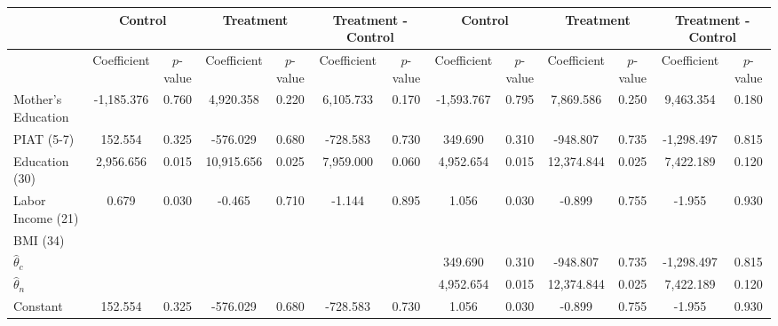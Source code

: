\begin{tabular}{lcccccccccccc} \toprule
&\multicolumn{2}{c}{Control} & \multicolumn{2}{c}{Treatment} & \multicolumn{2}{c}{Treatment - Control} & \multicolumn{2}{c}{Control} & \multicolumn{2}{c}{Treatment} & \multicolumn{2}{c}{Treatment - Control} \\ \midrule
 & Coefficient  & $p$-value  & Coefficient  & $p$-value & Coefficient  & $p$-value  & Coefficient  & $p$-value  & Coefficient  & $p$-value  & Coefficient  & $p$-value \\ \midrule
Mother's Education & -1,185.376 &     0.760 &  4,920.358 &     0.220 &  6,105.733 &     0.170 & -1,593.767 &     0.795 &  7,869.586 &     0.250 &  9,463.354 &     0.180 \\  
PIAT (5-7) &   152.554 &     0.325 &  -576.029 &     0.680 &  -728.583 &     0.730 &   349.690 &     0.310 &  -948.807 &     0.735 & -1,298.497 &     0.815 \\  
Education (30)  &  2,956.656 &     0.015 & 10,915.656 &     0.025 &  7,959.000 &     0.060 &  4,952.654 &     0.015 & 12,374.844 &     0.025 &  7,422.189 &     0.120 \\  
Labor Income (21) &     0.679 &     0.030 &    -0.465 &     0.710 &    -1.144 &     0.895 &     1.056 &     0.030 &    -0.899 &     0.755 &    -1.955 &     0.930 \\  
BMI (34) &        &        &        &        &        &        &        &        &        &        &        &         \\
$\hat{\theta}_{c}$ &        &        &        &        &        &        &   349.690 &     0.310 &  -948.807 &     0.735 & -1,298.497 &     0.815 \\  
$\hat{\theta}_{n}$ &        &        &        &        &        &        &  4,952.654 &     0.015 & 12,374.844 &     0.025 &  7,422.189 &     0.120 \\  
Constant &   152.554 &     0.325 &  -576.029 &     0.680 &  -728.583 &     0.730 &     1.056 &     0.030 &    -0.899 &     0.755 &    -1.955 &     0.930 \\  
\bottomrule \end{tabular}